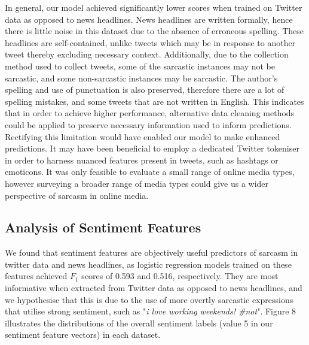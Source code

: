 \documentclass[12pt,a4paper]{article}
\begin{document}
In general, our model achieved significantly lower scores when trained on Twitter data as opposed to news headlines. News headlines are written formally, hence there is little noise in this dataset due to the absence of erroneous spelling. These headlines are self-contained, unlike tweets which may be in response to another tweet thereby excluding necessary context. Additionally, due to the collection method used to collect tweets, some of the sarcastic instances may not be sarcastic, and some non-sarcastic instances may be sarcastic. The author's spelling and use of punctuation is also preserved, therefore there are a lot of spelling mistakes, and some tweets that are not written in English. This indicates that in order to achieve higher performance, alternative data cleaning methods could be applied to preserve necessary information used to inform predictions. Rectifying this limitation would have enabled our model to make enhanced predictions. It may have been beneficial to employ a dedicated Twitter tokeniser in order to harness nuanced features present in tweets, such as hashtags or emoticons. It was only feasible to evaluate a small range of online media types, however surveying a broader range of media types could give us a wider perspective of sarcasm in online media.

 \subsection{Analysis of Sentiment Features}\vspace{-10pt}
\noindent We found that sentiment features are objectively useful predictors of sarcasm in twitter data and news headlines, as logistic regression models trained on these features achieved $F_1$ scores of 0.593 and 0.516, respectively. They  are most informative when extracted from Twitter data as opposed to news headlines, and we hypothesise that this is due to the use of more overtly sarcastic expressions that utilise strong sentiment, such as "\textit{i love working weekends! \#not}". Figure 8 illustrates the distributions of the overall sentiment labels (value 5 in our sentiment feature vectors) in each dataset.\\
\end{document}
